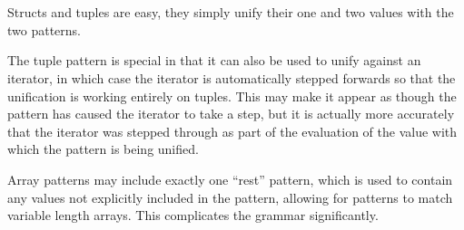 \begin{bnf*}
     \\
     \\
\end{bnf*}

Structs and tuples are easy, they simply unify their one and two values with
the two patterns.

The tuple pattern is special in that it can also be used to unify against
an iterator, in which case the iterator is automatically stepped forwards
so that the unification is working entirely on tuples. This may make it
appear as though the pattern has caused the iterator to take a step, but it
is actually more accurately that the iterator was stepped through as part
of the evaluation of the value with which the pattern is being unified.

\begin{prooftree}
\end{prooftree}

\begin{prooftree}
\end{prooftree}

Array patterns may include exactly one ``rest'' pattern, which is used to
contain any values not explicitly included in the pattern, allowing for
patterns to match variable length arrays. This complicates the grammar
significantly.

